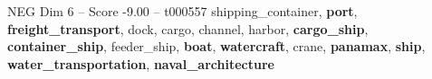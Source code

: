 \begin{textsample}{NEG Dim 6 – Score -9.00 – t000557}  \label{ex:f6_neg_012}
shipping\_container, \textbf{port}, \textbf{freight\_transport}, dock, cargo, channel, harbor, \textbf{cargo\_ship}, \textbf{container\_ship}, feeder\_ship, \textbf{boat}, \textbf{watercraft}, crane, \textbf{panamax}, \textbf{ship}, \textbf{water\_transportation}, \textbf{naval\_architecture}

\end{textsample}
